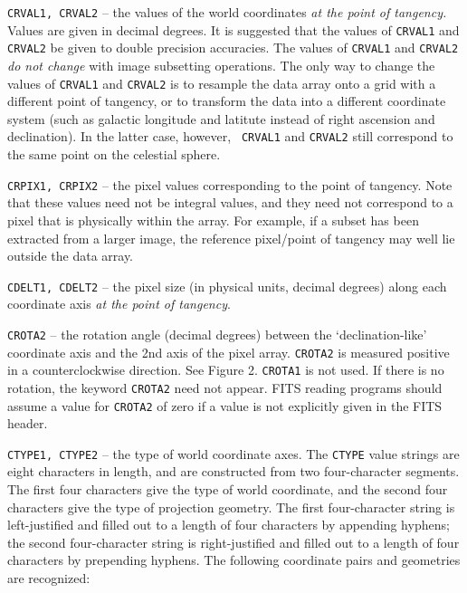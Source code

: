 {\tt CRVAL1, CRVAL2} -- the values of the world coordinates 
{\it at the point of tangency.}  Values are given in decimal degrees.
It is suggested that the values of {\tt CRVAL1} and {\tt CRVAL2} be given to
double precision accuracies.  The values of {\tt CRVAL1} and {\tt CRVAL2} {\it
do not change} with image subsetting operations.  The only way to change the
values of {\tt CRVAL1} and {\tt CRVAL2} is to resample the data array onto a
grid with a different point of tangency, or to transform the data into
a different coordinate system (such as galactic longitude and latitute instead
of right ascension and declination).   In the latter case, however, {\tt
CRVAL1} and {\tt CRVAL2} still correspond to the same point on the celestial
sphere. 

{\tt CRPIX1, CRPIX2} -- the pixel values corresponding to the point of
tangency.  Note that these values need not be integral values, and they
need not correspond to a pixel that is physically within the array. For
example, if a subset has been extracted from a larger image, the
reference pixel/point of tangency may well lie outside the data array.

{\tt CDELT1, CDELT2} -- the pixel size (in physical units, decimal
degrees) along each coordinate axis {\it at the point of tangency}.

{\tt CROTA2} -- the rotation angle (decimal degrees) between the
`declination-like' coordinate axis and the 2nd axis of the pixel array.
{\tt CROTA2} is measured positive in a counterclockwise direction.  See Figure
2.  {\tt CROTA1} is not used.  If there is no rotation, the keyword {\tt CROTA2}
need not appear.  FITS reading programs should assume a value for
{\tt CROTA2} of zero if a value is not explicitly given in the FITS header.

{\tt CTYPE1, CTYPE2} -- the type of world coordinate axes.  The {\tt CTYPE}
value strings are eight characters in length, and are constructed from
two four-character segments.  The first four characters give the type
of world coordinate, and the second four characters give the type of
projection geometry.  The first four-character string is left-justified
and filled out to a length of four characters by appending hyphens; the
second four-character string is right-justified and filled out to a length
of four characters by prepending hyphens. The following coordinate pairs and
geometries are recognized: 

